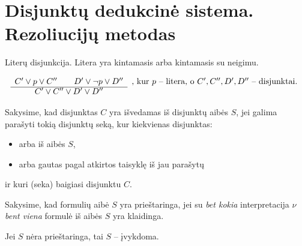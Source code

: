 \chapter{Disjunktų dedukcinė sistema. Rezoliucijų metodas}

\begin{defn}[Disjuktas]
  Literų disjunkcija. Litera yra kintamasis arba kintamasis su neigimu.
\end{defn}

\begin{defn}
  \[
  \begin{array}{c l}
    C' \lor p \lor C'' \qquad D' \lor \neg p \lor D'' &%
      \text{, kur $p$ – litera, o $C',C'',D',D''$ – disjunktai.} \\
    \cline{1-1}
    C' \lor C'' \lor D' \lor D'' &
  \end{array}
  \]
\end{defn}

\begin{defn}[$S \vdash C$]
  Sakysime, kad disjunktas $C$ yra išvedamas iš disjunktų aibės $S$, jei
  galima parašyti tokią disjunktų seką, kur kiekvienas disjunktas:
  \begin{itemize}
    \item arba iš aibės $S$,
    \item arba gautas pagal atkirtos taisyklę iš jau parašytų 
  \end{itemize}
  ir kuri (seka) baigiasi disjunktu $C$.
\end{defn}

\begin{defn}
  Sakysime, kad formulių aibė $S$ yra prieštaringa, jei su \emph{bet kokia}
  interpretacija $\nu$ \emph{bent viena} formulė iš aibės $S$ yra 
  klaidinga.
  \begin{note}
    Jei $S$ nėra prieštaringa, tai $S$ – įvykdoma.
  \end{note}
\end{defn}


